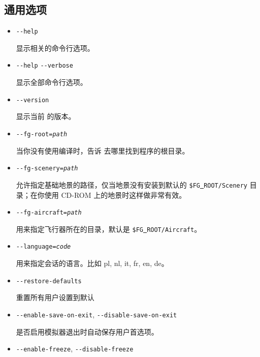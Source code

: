 \ifchinese
{
\subsection{通用选项}\label{generaloptions}
\begin{itemize}
\item{\texttt{-$ $-help}}

  显示相关的命令行选项。

\item{\texttt{-$ $-help} \texttt{-$ $-verbose}}

  显示全部命令行选项。

\item{\texttt{-$ $-version} }

  显示当前 \FlightGear{} 的版本。

\item{\texttt{-$ $-fg-root={\it path}}}

  当你没有使用编译时，告诉 \FlightGear{} 去哪里找到程序的根目录。

\item{\texttt{-$ $-fg-scenery={\it path}}}

  允许指定基础地景的路径，仅当地景没有安装到默认的 \texttt{\$FG\underline{~}ROOT/Scenery} 目录；在你使用 CD-ROM 上的地景时这样做非常有效。

\item{\texttt{-$ $-fg-aircraft={\it path}}}

  用来指定飞行器所在的目录，默认是 \texttt{\$FG\underline{~}ROOT/Aircraft}。

\item{\texttt{-$ $-language={\it code}}}

  用来指定会话的语言。比如 pl, nl, it, fr, en, de。

\item{\texttt{-$ $-restore-defaults}}

  重置所有用户设置到默认

\item{\texttt{-$ $-enable-save-on-exit}, \texttt{-$ $-disable-save-on-exit}}

  是否启用模拟器退出时自动保存用户首选项。

\item{\texttt{-$ $-enable-freeze}, \texttt{-$ $-disable-freeze}}


\end{itemize}}
